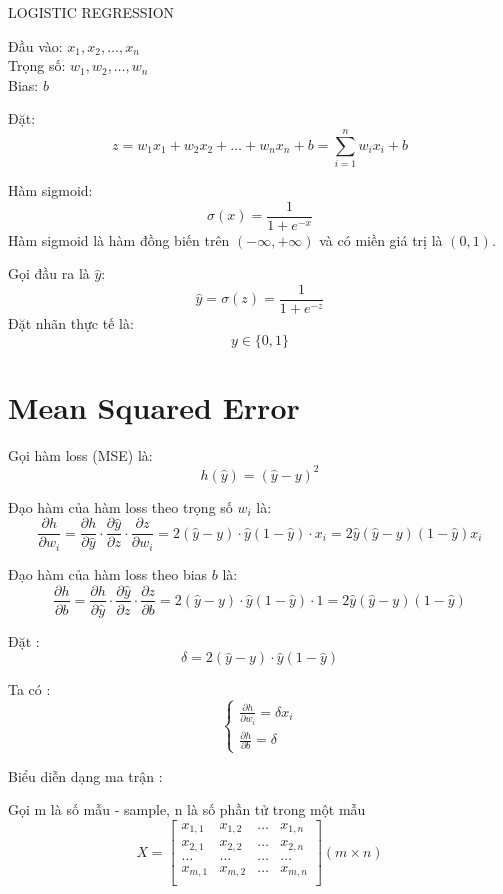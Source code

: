 \documentclass{article}
\begin{document}
\begin{center}
    {\LARGE LOGISTIC REGRESSION}
\end{center}

\noindent Đầu vào: $x_1, x_2, \ldots, x_n$ \\
Trọng số: $w_1, w_2, \ldots, w_n$ \\
Bias: $b$

\vspace{0.3cm}
\noindent Đặt: \[z = w_1x_1 + w_2x_2 + \dots + w_nx_n + b = \sum_{i = 1}^{n}w_ix_i + b\] 

\noindent Hàm sigmoid: \[\sigma(x) = \frac{1}{1+e^{-x}}\]
Hàm sigmoid là hàm đồng biến trên $(-\infty, +\infty)$ và có miền giá trị là $(0, 1)$.

\vspace{0.3cm}
\noindent Gọi đầu ra là $\hat{y}$: \[\hat{y} = \sigma(z) = \frac{1}{1+e^{-z}}\]
Đặt nhãn thực tế là: \[y \in \{0, 1\}\]
\section{Mean Squared Error}
Gọi hàm loss (MSE) là: \[h(\hat{y}) = (\hat{y} - y)^2\] 

\noindent Đạo hàm của hàm loss theo trọng số $w_i$ là:
\[
    \frac{\partial h}{\partial w_i} = 
    \frac{\partial h}{\partial \hat{y}} \cdot
    \frac{\partial \hat{y}}{\partial z} \cdot
    \frac{\partial z}{\partial w_i} =
    2(\hat{y} - y) \cdot \hat{y}(1 - \hat{y}) \cdot x_i = 
    2\hat{y}(\hat{y} - y)(1 - \hat{y})x_i
\]

\noindent Đạo hàm của hàm loss theo bias $b$ là:
\[
    \frac{\partial h}{\partial b} = 
    \frac{\partial h}{\partial \hat{y}} \cdot
    \frac{\partial \hat{y}}{\partial z} \cdot
    \frac{\partial z}{\partial b} =
    2(\hat{y} - y) \cdot \hat{y}(1 - \hat{y}) \cdot 1 = 
    2\hat{y}(\hat{y} - y)(1 - \hat{y})
\]

\noindent Đặt :
\[\delta = 2(\hat{y} - y) \cdot \hat{y}(1 - \hat{y})\]

\noindent Ta có :
\[
    \begin{cases}
        \frac{\partial h}{\partial w_i} = \delta x_i \\
        \frac{\partial h}{\partial b} = \delta
    \end{cases}
\]

\noindent Biểu diễn dạng ma trận :

\vspace{0.3cm}
\noindent Gọi m là số mẫu - sample, n là số phần tử trong một mẫu
\[
    X = \begin{bmatrix}
        x_{1, 1} & x_{1, 2} & \hdots & x_{1, n} \\
        x_{2, 1} & x_{2, 2} & \hdots & x_{2, n} \\
        \hdots & \hdots & \hdots & \hdots \\
        x_{m, 1} & x_{m, 2} & \hdots & x_{m, n} \\
    \end{bmatrix} (m \times n)
\]
\end{document}
